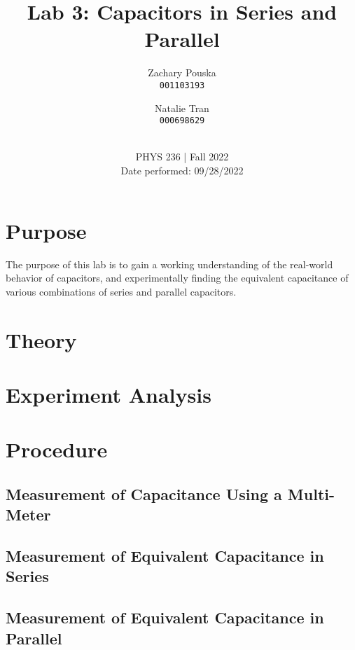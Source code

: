 \documentclass[titlepage]{article}
\begin{document}
\title{\textbf{Lab 3: Capacitors in Series and Parallel}}
\author{
    Zachary Pouska\\
    \texttt{001103193}\\
    \and
    Natalie Tran \\ 
    \texttt{000698629}\\ \\
} 

\date{PHYS 236 | Fall 2022\\
Date performed: 09/28/2022}


	\maketitle



	\section{Purpose}
    The purpose of this lab is to gain a working understanding of the real-world behavior of capacitors, and experimentally finding the equivalent capacitance of various combinations of series and parallel capacitors.

	\section{Theory}	




	\section{Experiment Analysis}
    



	\section{Procedure}

        \subsection{Measurement of Capacitance Using a Multi-Meter}



        \subsection{Measurement of Equivalent Capacitance in Series}


        \subsection{Measurement of Equivalent Capacitance in Parallel}
\end{document}
